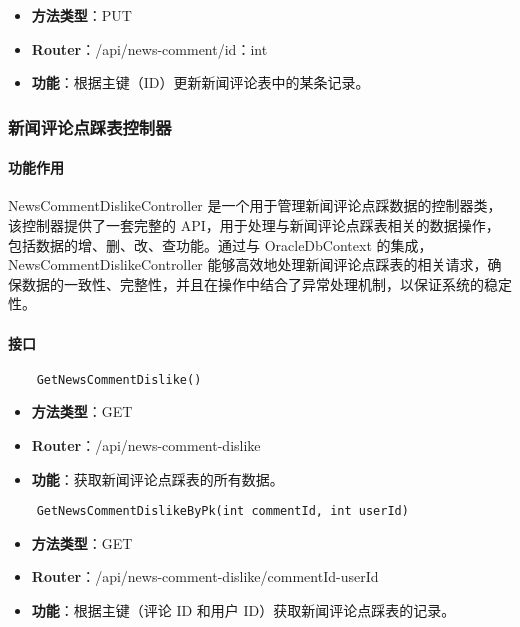 \begin{itemize}
	\item \textbf{方法类型}：PUT
	\item \textbf{Router}：/api/news-comment/{id：int}
	\item \textbf{功能}：根据主键（ID）更新新闻评论表中的某条记录。
\end{itemize}

\subsubsection{新闻评论点踩表控制器}

\paragraph{功能作用}

NewsCommentDislikeController 是一个用于管理新闻评论点踩数据的控制器类，该控制器提供了一套完整的 API，用于处理与新闻评论点踩表相关的数据操作，包括数据的增、删、改、查功能。通过与 OracleDbContext 的集成，NewsCommentDislikeController 能够高效地处理新闻评论点踩表的相关请求，确保数据的一致性、完整性，并且在操作中结合了异常处理机制，以保证系统的稳定性。

\paragraph{接口}

\begin{verbatim}
	GetNewsCommentDislike()
\end{verbatim}

\begin{itemize}
	\item \textbf{方法类型}：GET
	\item \textbf{Router}：/api/news-comment-dislike
	\item \textbf{功能}：获取新闻评论点踩表的所有数据。
\end{itemize}

\begin{verbatim}
	GetNewsCommentDislikeByPk(int commentId, int userId)
\end{verbatim}

\begin{itemize}
	\item \textbf{方法类型}：GET
	\item \textbf{Router}：/api/news-comment-dislike/{commentId}-{userId}
	\item \textbf{功能}：根据主键（评论 ID 和用户 ID）获取新闻评论点踩表的记录。
\end{itemize}


